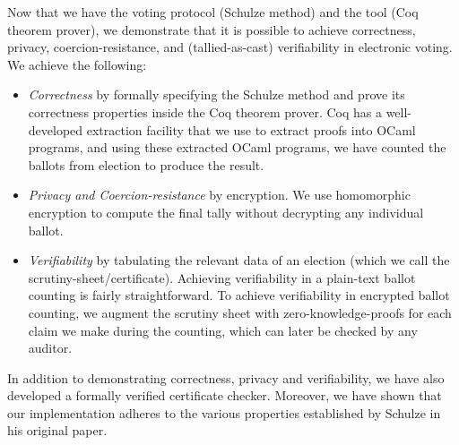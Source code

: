Now that we have the voting protocol (Schulze method) and  the tool (Coq theorem prover), 
we demonstrate that it is possible to achieve correctness, privacy, coercion-resistance, and (tallied-as-cast) verifiability in 
electronic voting. We achieve the following:
\begin{itemize}
 \item \textit{Correctness} by formally specifying the Schulze method  and prove its correctness properties
  inside the Coq theorem prover. 
 Coq has a well-developed extraction facility that 
 we use to extract proofs into OCaml programs, and using these extracted OCaml programs, we 
 have counted the ballots from election to produce the result. 
 \item \textit{Privacy and Coercion-resistance} by encryption. We use homomorphic encryption to compute the 
  final tally without decrypting any individual ballot. 
\item \textit{Verifiability} by tabulating the relevant data of an election (which we call the scrutiny-sheet/certificate).
   Achieving verifiability in a plain-text ballot counting is fairly straightforward.  
   To achieve verifiability in encrypted ballot counting, 
   we augment the scrutiny sheet with zero-knowledge-proofs for each claim we make during the 
   counting, which can  later be checked by any auditor.  
\end{itemize}



In addition to demonstrating correctness, privacy and verifiability, we have also developed a formally verified certificate 
checker. Moreover, we have shown that our implementation adheres to the various properties established by Schulze in 
his original paper. 

